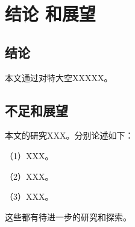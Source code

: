 \setcounter{secnumdepth}{-2}
\chapter{结\quad 论 \quad 和\quad 展\quad 望}

\section*{结论}
本文通过对特大空XXXXX。

\section*{不足和展望}

本文的研究XXX。分别论述如下：

（1）XXX。

（2）XXX。

（3）XXX。

这些都有待进一步的研究和探索。
